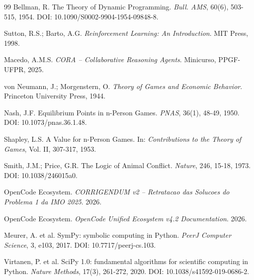 \documentclass[5p]{elsarticle}
\begin{document}
\begin{thebibliography}{99}
Bellman, R. The Theory of Dynamic Programming. \textit{Bull. AMS}, 60(6),
503-515, 1954. DOI: 10.1090/S0002-9904-1954-09848-8.

Sutton, R.S.; Barto, A.G. \textit{Reinforcement Learning: An Introduction}.
MIT Press, 1998.

Macedo, A.M.S. \textit{CORA -- Collaborative Reasoning Agents}. Minicurso,
PPGF-UFPR, 2025.

von Neumann, J.; Morgenstern, O. \textit{Theory of Games and Economic
Behavior}. Princeton University Press, 1944.

Nash, J.F. Equilibrium Points in n-Person Games. \textit{PNAS}, 36(1), 48-49,
1950. DOI: 10.1073/pnas.36.1.48.

Shapley, L.S. A Value for n-Person Games. In: \textit{Contributions to the
Theory of Games}, Vol. II, 307-317, 1953.

Smith, J.M.; Price, G.R. The Logic of Animal Conflict. \textit{Nature}, 246,
15-18, 1973. DOI: 10.1038/246015a0.

OpenCode Ecosystem. \textit{CORRIGENDUM v2 -- Retratacao das Solucoes do
Problema 1 da IMO 2025}. 2026.

OpenCode Ecosystem. \textit{OpenCode Unified Ecosystem v4.2 Documentation}.
2026.

Meurer, A. et al. SymPy: symbolic computing in Python. \textit{PeerJ
Computer Science}, 3, e103, 2017. DOI: 10.7717/peerj-cs.103.

Virtanen, P. et al. SciPy 1.0: fundamental algorithms for scientific
computing in Python. \textit{Nature Methods}, 17(3), 261-272, 2020.
DOI: 10.1038/s41592-019-0686-2.

\end{thebibliography}
\end{document}
